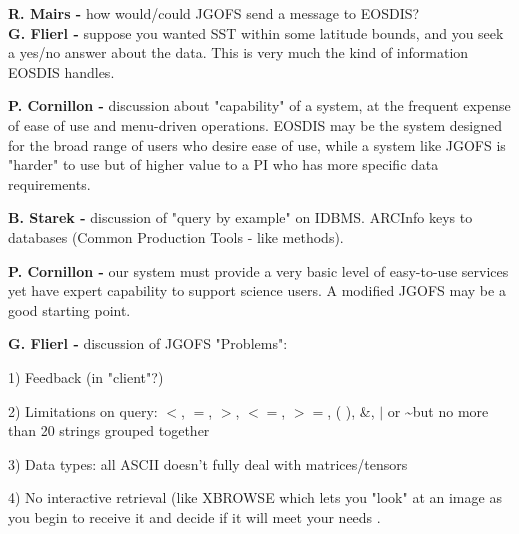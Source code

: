 \begin{description}
\end{description}

\smallskip
{\bf R. Mairs -} how would/could JGOFS send a message to EOSDIS? \\
{\bf G. Flierl -} suppose you wanted SST within some latitude bounds, 
and you seek a yes/no answer about the data. This is very much the kind of 
information EOSDIS handles.

\smallskip
{\bf P. Cornillon -} discussion about "capability" of a system, at the
frequent expense of ease of use and menu-driven operations.  EOSDIS may be
the system designed for the broad range of users who desire ease of use,
while a system like JGOFS is "harder" to use but of higher value to a PI who
has more specific data requirements.

\smallskip
{\bf B. Starek -} discussion of "query by example" on IDBMS. ARCInfo keys to 
databases (Common Production Tools - like methods).  

\smallskip
{\bf P. Cornillon -} our system must provide a very basic level of easy-to-use 
services yet have expert capability to support science users.  A modified 
JGOFS may be a good starting point.

\smallskip
{\bf G. Flierl -} discussion of JGOFS "Problems":
\begin{description}
	\item{1)} Feedback (in "client"?)

	\item{2)} Limitations on query: $<$, $=$, $>$, $<=$,  $>=$, (  ), \&, $|$ or
\~ \quad but no more than 20 strings grouped together 

	\item{3)} Data types: all ASCII doesn't fully deal with
matrices/tensors 

	\item{4)} No interactive retrieval (like XBROWSE which lets you
"look" at an image as you begin to receive it and decide if it will meet your needs .  
\end{description}
\medskip


